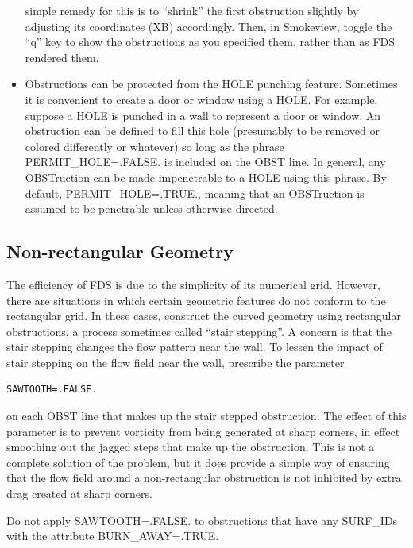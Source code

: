 \documentclass[11pt]{book}
\begin{document}
\begin{itemize}
simple remedy for this is to ``shrink'' the first obstruction slightly by adjusting its coordinates ({\ct XB}) accordingly. Then, in
Smokeview, toggle the ``q'' key to show the obstructions as you specified them, rather than as FDS rendered them.
\item Obstructions can be protected from the {\ct HOLE} punching feature. Sometimes
it is convenient to create a door or window using a {\ct HOLE}. For example, suppose a
{\ct HOLE} is punched in a wall to represent a door or window. An obstruction can be
defined to fill this hole (presumably to be removed or colored differently or whatever) so
long as the phrase {\ct PERMIT\_HOLE=.FALSE.} is included on the {\ct OBST} line. In general,
any {\ct OBST}ruction can be made impenetrable to a {\ct HOLE} using this phrase. By default,
{\ct PERMIT\_HOLE=.TRUE.}, meaning that an {\ct OBST}ruction is assumed to be penetrable unless
otherwise directed.
\end{itemize}

\subsection{Non-rectangular Geometry}%

The efficiency of FDS is due to the simplicity of its numerical grid.
However, there are situations in which certain geometric features do
not conform to the rectangular grid. In these cases,
construct the curved geometry using rectangular obstructions, a process
sometimes called ``stair stepping''. A concern is that
the stair stepping changes the flow pattern near the wall. To lessen
the impact of stair stepping on the flow field near the wall,
prescribe the parameter

\footnotesize
\begin{verbatim}
SAWTOOTH=.FALSE.
\end{verbatim}
\normalsize
on each {\ct OBST} line that makes up the stair stepped obstruction.
The effect of this parameter is to prevent vorticity from being generated
at sharp corners, in effect smoothing out the jagged steps that make up
the obstruction. This is not a complete solution of the problem, but it
does provide a simple way of ensuring that the flow field around a
non-rectangular obstruction is not inhibited by extra drag created at
sharp corners.

\begin{warning}
Do not apply {\ct SAWTOOTH=.FALSE.} to obstructions that have any {\ct SURF\_ID}s with the
attribute {\ct BURN\_AWAY=.TRUE.}
\end{warning}
\end{document}
